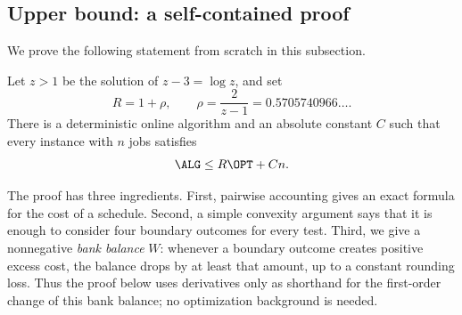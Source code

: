 \subsection{Upper bound: a self-contained proof}
\label{sec:upper}

We prove the following statement from scratch in this subsection.

\begin{theorem}
\label{thm:upper}
Let $z>1$ be the solution of $z-3=\log z$, and set
\[
 R=1+\rho,
 \qquad
 \rho=\frac{2}{z-1}=0.5705740966\ldots .
\]
There is a deterministic online algorithm and an absolute constant $C$ such
that every instance with $n$ jobs satisfies
\[
  \ALG\le R\OPT+Cn.
\]
\end{theorem}

The proof has three ingredients.  First, pairwise accounting gives an exact
formula for the cost of a schedule.  Second, a simple convexity argument says
that it is enough to consider four boundary outcomes for every test.  Third,
we give a nonnegative \emph{bank balance} $W$: whenever a boundary outcome
creates positive excess cost, the balance drops by at least that amount, up
to a constant rounding loss.  Thus the proof below uses derivatives only as
shorthand for the first-order change of this bank balance; no optimization
background is needed.

